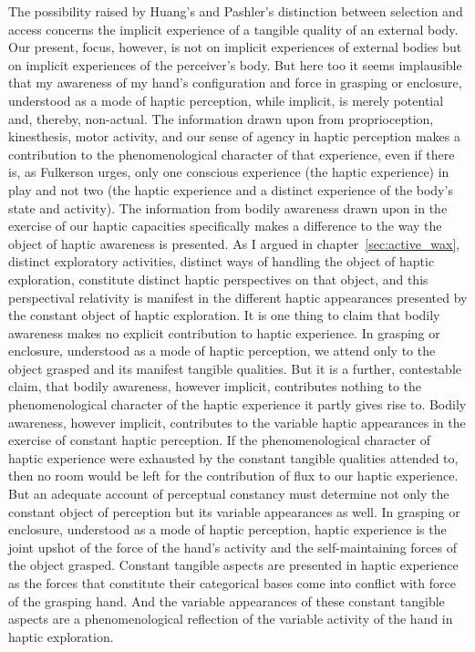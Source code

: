 The possibility raised by Huang's and Pashler's distinction between selection and access concerns the implicit experience of a tangible quality of an external body. Our present, focus, however, is not on implicit experiences of external bodies but on implicit experiences of the perceiver's body. But here too it seems implausible that my awareness of my hand's configuration and force in grasping or enclosure, understood as a mode of haptic perception, while implicit, is merely potential and, thereby, non-actual. The information drawn upon from proprioception, kinesthesis, motor activity, and our sense of agency in haptic perception makes a contribution to the phenomenological character of that experience, even if there is, as Fulkerson urges, only one conscious experience (the haptic experience) in play and not two (the haptic experience and a distinct experience of the body's state and activity). The information from bodily awareness drawn upon in the exercise of our haptic capacities specifically makes a difference to the way the object of haptic awareness is presented. As I argued in chapter~\ref{sec:active_wax}, distinct exploratory activities, distinct ways of handling the object of haptic exploration, constitute distinct haptic perspectives on that object, and this perspectival relativity is manifest in the different haptic appearances presented by the constant object of haptic exploration. It is one thing to claim that bodily awareness makes no explicit contribution to haptic experience. In grasping or enclosure, understood as a mode of haptic perception, we attend only to the object grasped and its manifest tangible qualities. But it is a further, contestable claim, that bodily awareness, however implicit, contributes nothing to the phenomenological character of the haptic experience it partly gives rise to. Bodily awareness, however implicit, contributes to the variable haptic appearances in the exercise of constant haptic perception. If the phenomenological character of haptic experience were exhausted by the constant tangible qualities attended to, then no room would be left for the contribution of flux to our haptic experience. But an adequate account of perceptual constancy must determine not only the constant object of perception but its variable appearances as well. In grasping or enclosure, understood as a mode of haptic perception, haptic experience is the joint upshot of the force of the hand's activity and the self-maintaining forces of the object grasped. Constant tangible aspects are presented in haptic experience as the forces that constitute their categorical bases come into conflict with force of the grasping hand. And the variable appearances of these constant tangible aspects are a phenomenological reflection of the variable activity of the hand in haptic exploration.



